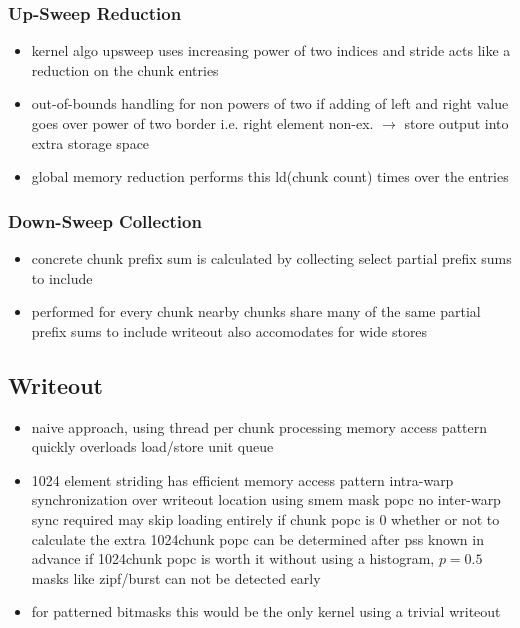\documentclass{tudscrartcl}
\begin{document}
			\subsubsection{Up-Sweep Reduction}
				\begin{itemize}
					\item kernel algo upsweep uses increasing power of two indices and stride
						\subitem acts like a reduction on the chunk entries
					\item out-of-bounds handling for non powers of two
						\subitem if adding of left and right value goes over power of two border
						\subitem i.e. right element non-ex. $\rightarrow$ store output into extra storage space
					\item global memory reduction performs this ld(chunk count) times over the entries
				\end{itemize}
			
			\subsubsection{Down-Sweep Collection}
				\begin{itemize}
					\item concrete chunk prefix sum is calculated by collecting select partial prefix sums to include
					\item performed for every chunk
						\subitem nearby chunks share many of the same partial prefix sums to include
						\subitem writeout also accomodates for wide stores
				\end{itemize}
			
		\subsection{Writeout}
			\begin{itemize}
				\item naive approach, using thread per chunk processing
					\subitem memory access pattern quickly overloads load/store unit queue
				\item 1024 element striding has efficient memory access pattern
					\subitem intra-warp synchronization over writeout location using smem mask popc
					\subitem no inter-warp sync required
					\subitem may skip loading entirely if chunk popc is 0
					\subitem whether or not to calculate the extra 1024chunk popc can be determined after pss
						\subsubitem known in advance if 1024chunk popc is worth it
						\subsubitem without using a histogram, $p=0.5$ masks like zipf/burst can not be detected early
				\item for patterned bitmasks this would be the only kernel using a trivial writeout
			\end{itemize}
		
\end{document}
